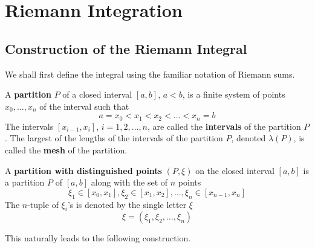 \section{Riemann Integration}

\subsection{Construction of the Riemann Integral}

  We shall first define the integral using the familiar notation of Riemann sums. 

  \begin{definition}
    A \textbf{partition} $P$ of a closed interval $[a, b]$, $a < b$, is a finite system of points $x_0, \ldots, x_n$ of the interval such that
    \[a = x_0 < x_1 < x_2 < \ldots < x_n = b\]
    The intervals $[x_{i-1}, x_i]$, $i = 1, 2, \ldots, n$, are called the \textbf{intervals} of the partition $P$. The largest of the lengths of the intervals of the partition $P$, denoted $\lambda(P)$, is called the \textbf{mesh} of the partition. 

    A \textbf{partition with distinguished points} $(P, \xi)$ on the closed interval $[a, b]$ is a partition $P$ of $[a,b]$ along with the set of $n$ points 
    \[\xi_1 \in [x_0, x_1], \xi_2 \in [x_1, x_2], \ldots, \xi_n \in [x_{n-1}, x_n]\]
    The $n$-tuple of $\xi_i$'s is denoted by the single letter $\xi$
    \[\xi = (\xi_1, \xi_2, \ldots, \xi_n)\]
  \end{definition}

  This naturally leads to the following construction. 


